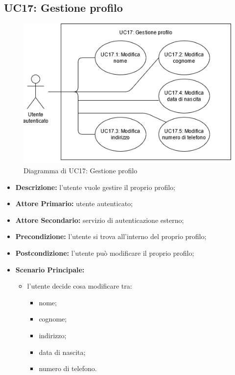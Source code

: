 \subsection{UC17: Gestione profilo}
\label{sec:UC17}
\begin{figure}[!ht]
    \caption{Diagramma di UC17: Gestione profilo}
    \vspace{10px}
    \includegraphics[scale=0.5]{../../../Images/AnalisiRequisiti/UC17}
    \centering
\end{figure}

\begin{itemize}
    \item \textbf{Descrizione:} l'utente vuole gestire il proprio profilo;
    \item \textbf{Attore Primario:} utente autenticato;
    \item \textbf{Attore Secondario:} servizio di autenticazione esterno;
    \item \textbf{Precondizione:} l'utente si trova all'interno del proprio profilo;
    \item \textbf{Postcondizione:} l'utente può modificare il proprio profilo;
    \item \textbf{Scenario Principale:}
          \begin{itemize}
              \item  l'utente decide cosa modificare tra:
                    \begin{itemize}
                        \item nome;
                        \item cognome;
                        \item indirizzo;
                        \item data di nascita;
                        \item numero di telefono.
                    \end{itemize}
          \end{itemize}
\end{itemize}

